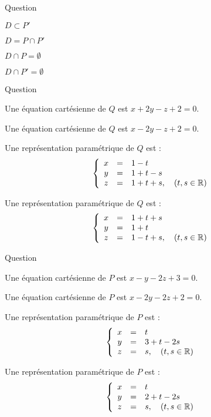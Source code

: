 \begin{multi}[multiple,feedback=
{On vérifie que  \(D=P\cap P'\).
}]{Question}
    \item* \(D\subset P'\)
    \item* \(D=P\cap P'\)
    \item \(D\cap P=\emptyset\)
    \item \(D\cap P'=\emptyset\)
\end{multi}


\begin{multi}[multiple,feedback=
{\(Q\) passe par \(A\) et est dirigé par \(\vec{n}\) et \(\vec{n'}\), où \(\vec{n}\) et \(\vec{n'}\) sont des vecteurs normaux à \(P\) et à \(P'\) respectivement.
}]{Question}
    \item Une équation cartésienne de \(Q\) est \(x+2y-z+2=0\).
    \item* Une équation cartésienne de \(Q\) est \(x-2y-z+2=0\).
    \item Une représentation paramétrique de \(Q\) est :
\[\left\{\begin{array}{ccl}x&=&1-t\\y&=&1+t-s\\ z&=&1+t+s,\quad (t,s \in \mathbb{R}) \end{array}\right.\]
    \item* Une représentation paramétrique de \(Q\) est :
\[\left\{\begin{array}{ccl}x&=&1+t+s\\y&=&1+t\\ z&=&1-t+s,\quad (t,s \in \mathbb{R}) \end{array}\right.\]
\end{multi}


\begin{multi}[multiple,feedback=
{Un vecteur directeur de \(D\) est un vecteur normal à \(P\).
}]{Question}
    \item* Une équation cartésienne de \(P\) est \(x-y-2z+3=0\).
    \item Une équation cartésienne de \(P\) est \(x-2y-2z+2=0\).
    \item* Une représentation paramétrique de \(P\) est :
\[\left\{\begin{array}{ccl}x&=&t\\y&=&3+t-2s\\ z&=&s,\quad (t,s \in \mathbb{R}) \end{array}\right.\]
    \item Une représentation paramétrique de \(P\) est :
\[\left\{\begin{array}{ccl}x&=&t\\y&=&2+t-2s\\ z&=&s,\quad (t,s \in \mathbb{R}) \end{array}\right.\]
\end{multi}


